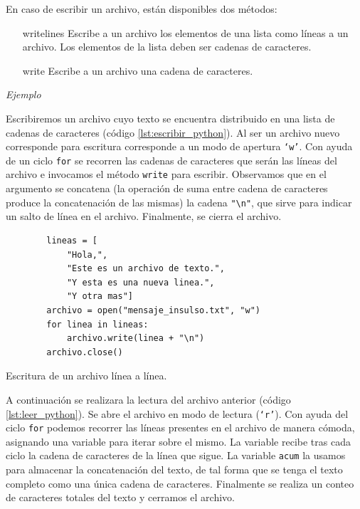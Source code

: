 En caso de escribir un archivo, están disponibles dos métodos:

\begin{itemize}
    \item[writelines] Escribe a un archivo los elementos de una lista como líneas a un archivo. Los elementos de
    la lista deben ser cadenas de caracteres.
    \item[write] Escribe a un archivo una cadena de caracteres.
\end{itemize}

\textit{Ejemplo}

Escribiremos un archivo cuyo texto se encuentra distribuido en una lista de
cadenas de caracteres (código \ref{lst:escribir_python}). Al ser un archivo nuevo corresponde para escritura
corresponde a un modo de apertura \texttt{`w'}. Con ayuda de un ciclo \texttt{for}
se recorren las cadenas de caracteres que serán las líneas del archivo e invocamos
el método \texttt{write} para escribir. Observamos que en el argumento se concatena
(la operación de suma entre cadena de caracteres produce la concatenación de las mismas)
la cadena \verb-"\n"-, que sirve para indicar un salto de línea en el archivo. Finalmente, se
cierra el archivo.

\begin{listing}[H]
    \begin{verbatim}
        lineas = [
            "Hola,",
            "Este es un archivo de texto.",
            "Y esta es una nueva linea.",
            "Y otra mas"]
        archivo = open("mensaje_insulso.txt", "w")
        for linea in lineas:
            archivo.write(linea + "\n")
        archivo.close()
    \end{verbatim}
    \caption{Escritura de un archivo línea a línea.}
    \label{lst:escribir_python}
\end{listing}

A continuación se realizara la lectura del archivo anterior (código \ref{lst:leer_python}). Se abre el archivo
en modo de lectura (\texttt{`r'}). Con ayuda del ciclo \texttt{for} podemos recorrer
las líneas presentes en el archivo de manera cómoda, asignando una variable para iterar
sobre el mismo. La variable recibe tras cada ciclo la cadena de caracteres de la línea
que sigue. La variable \texttt{acum} la usamos para almacenar la concatenación del texto,
de tal forma que se tenga el texto completo como una única cadena de caracteres. Finalmente
se realiza un conteo de caracteres totales del texto y cerramos el archivo.

